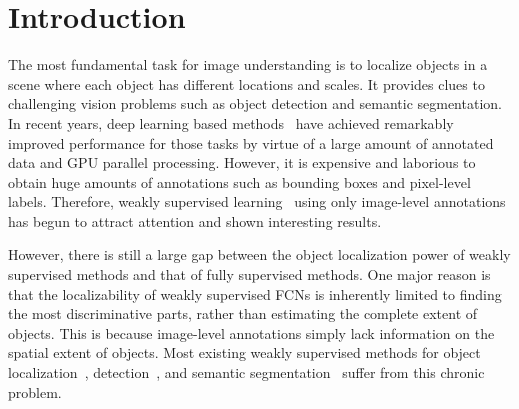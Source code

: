 \documentclass[10pt,twocolumn,letterpaper]{article}
\begin{document}
\section{Introduction}

The most fundamental task for image understanding is to localize objects in a scene where each object has different locations and scales. It provides clues to challenging vision problems such as object detection and semantic segmentation. In recent years, deep learning based methods~\cite{GirshickDDM14,girshick15ICCV15,Shaoqing15NIPS,Long15CVPR,Noh15ICCV,chen14deeplab,LongSD15fcn,XiaDDCY13bbox} have achieved remarkably improved performance for those tasks by virtue of a large amount of annotated data and GPU parallel processing. However, it is expensive and laborious to obtain huge amounts of annotations such as bounding boxes and pixel-level labels. Therefore, weakly supervised learning~\cite{Oquab15,zhou2016cvpr,Bilen16,KantorovOCL16,Pinheiro2015CVPR,kolesnikov2016seed,KolesnikovL16a,Papandreou_2015_ICCV,pathakICCV15ccnn,SalehASPGA16builtin,Wei15stc} using only image-level annotations has begun to attract attention and shown interesting results.

However, there is still a large gap between the object localization power of weakly supervised methods and that of fully supervised methods. One major reason is that the localizability of weakly supervised FCNs is inherently limited to finding the most discriminative parts, rather than estimating the complete extent of objects. This is because image-level annotations simply lack information on the spatial extent of objects. Most existing weakly supervised methods for object localization~\cite{Oquab15,zhou2016cvpr,ZhangLBSS16exci,CinbisVS17multifold}, detection~\cite{Bilen16,KantorovOCL16,CholakkalJR16scspm,ShiF16size,BilenPT15wdet,WangHRZM15tipdet}, and semantic segmentation~\cite{Pinheiro2015CVPR,kolesnikov2016seed,KolesnikovL16a,Papandreou_2015_ICCV,pathakICCV15ccnn,SalehASPGA16builtin,Wei15stc,VasconcelosVC06,VezhnevetsB10,XuSU14tellme} suffer from this chronic problem.
\end{document}
